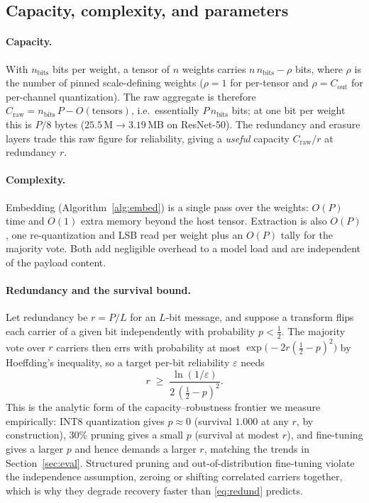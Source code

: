 \documentclass[a4paper,fleqn]{cas-dc}
\theoremstyle{plain}
\theoremstyle{remark}
\begin{document}
\subsection{Capacity, complexity, and parameters}\label{sec:analysis}
\paragraph{Capacity.} With $n_{\mathrm{bits}}$ bits per weight, a tensor of $n$ weights
carries $n\,n_{\mathrm{bits}}-\rho$ bits, where $\rho$ is the number of pinned
scale-defining weights ($\rho=1$ for per-tensor and $\rho=C_{\mathrm{out}}$ for
per-channel quantization). The raw aggregate is therefore
$C_{\mathrm{raw}}=n_{\mathrm{bits}}\,P-O(\text{tensors})$, i.e.\ essentially
$P\,n_{\mathrm{bits}}$ bits; at one bit per weight this is $P/8$ bytes
($25.5\,\mathrm{M}\to 3.19$\,MB on ResNet-50). The redundancy and erasure layers trade
this raw figure for reliability, giving a \emph{useful} capacity $C_{\mathrm{raw}}/r$ at
redundancy $r$.

\paragraph{Complexity.} Embedding (Algorithm~\ref{alg:embed}) is a single pass over the
weights: $O(P)$ time and $O(1)$ extra memory beyond the host tensor. Extraction is also
$O(P)$, one re-quantization and LSB read per weight plus an $O(P)$ tally for the majority
vote. Both add negligible overhead to a model load and are independent of the payload
content.

\paragraph{Redundancy and the survival bound.} Let redundancy be $r=P/L$ for an
$L$-bit message, and suppose a transform flips each carrier of a given bit independently
with probability $p<\tfrac12$. The majority vote over $r$ carriers then errs with
probability at most $\exp\!\big(-2r(\tfrac12-p)^2\big)$ by Hoeffding's inequality, so a
target per-bit reliability $\varepsilon$ needs
\begin{equation}\label{eq:redund}
r \;\ge\; \frac{\ln(1/\varepsilon)}{2\,(\tfrac12-p)^2}.
\end{equation}
This is the analytic form of the capacity--robustness frontier we measure empirically:
INT8 quantization gives $p\approx0$ (survival $1.000$ at any $r$, by construction),
$30\%$ pruning gives a small $p$ (survival at modest $r$), and fine-tuning gives a larger
$p$ and hence demands a larger $r$, matching the trends in
Section~\ref{sec:eval}. Structured pruning and out-of-distribution fine-tuning violate
the independence assumption, zeroing or shifting correlated carriers together, which is
why they degrade recovery faster than \eqref{eq:redund} predicts.
\end{document}
